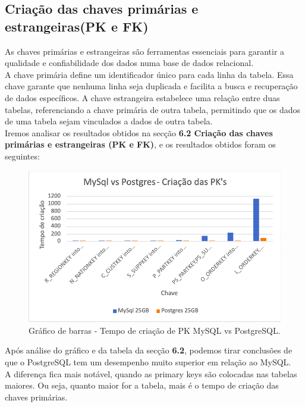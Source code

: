 \documentclass{article}
\begin{document}
\subsection{Criação das chaves primárias e estrangeiras(PK e FK)}

\quad As chaves primárias e estrangeiras são ferramentas essenciais para garantir a qualidade e confiabilidade dos dados numa base de dados relacional. \\
A chave primária define um identificador único para cada linha da tabela. Essa chave garante que nenhuma linha seja duplicada e facilita a busca e recuperação de dados específicos. A chave estrangeira estabelece uma relação entre duas tabelas, referenciando a chave primária de outra tabela, permitindo que os dados de uma tabela sejam vinculados a dados de outra tabela.\\

\quad Iremos analisar os resultados obtidos na secção \textbf{6.2 Criação das chaves primárias e estrangeiras (PK e FK)}, e os resultados obtidos foram os seguintes:

\begin{figure}[H]
  \centering
  \includegraphics[width=\textwidth]{Graphs/PKCreation.png}
  \caption{Gráfico de barras - Tempo de criação de PK MySQL vs PostgreSQL.}
  \label{fig:PKCreation1}
\end{figure}



\quad Após análise do gráfico e da tabela da secção \textbf{6.2}, podemos tirar conclusões de que o PostgreSQL tem um desempenho muito superior em relação ao MySQL. \\

A diferença fica mais notável, quando as primary keys são colocadas nas tabelas maiores. Ou seja, quanto maior for a tabela, mais é o tempo de criação das chaves primárias.
\end{document}
